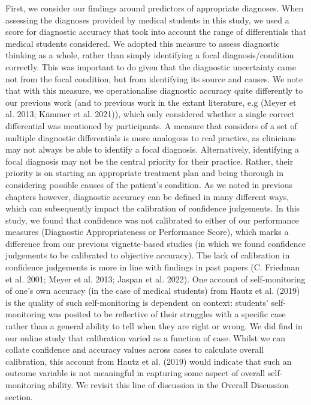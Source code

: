 \documentclass[a4paper, nobind]{templates/ociamthesis}
\begin{document}
First, we consider our findings around predictors of appropriate diagnoses. When assessing the diagnoses provided by medical students in this study, we used a score for diagnostic accuracy that took into account the range of differentials that medical students considered. We adopted this measure to assess diagnostic thinking as a whole, rather than simply identifying a focal diagnosis/condition correctly. This was important to do given that the diagnostic uncertainty came not from the focal condition, but from identifying its source and causes. We note that with this measure, we operationalise diagnostic accuracy quite differently to our previous work (and to previous work in the extant literature, e.g (Meyer et al. 2013; Kämmer et al. 2021)), which only considered whether a single correct differential was mentioned by participants. A measure that considers of a set of multiple diagnostic differentials is more analogous to real practice, as clinicians may not always be able to identify a focal diagnosis. Alternatively, identifying a focal diagnosis may not be the central priority for their practice. Rather, their priority is on starting an appropriate treatment plan and being thorough in considering possible causes of the patient's condition. As we noted in previous chapters however, diagnostic accuracy can be defined in many different ways, which can subsequently impact the calibration of confidence judgements. In this study, we found that confidence was not calibrated to either of our performance measures (Diagnostic Appropriateness or Performance Score), which marks a difference from our previous vignette-based studies (in which we found confidence judgements to be calibrated to objective accuracy). The lack of calibration in confidence judgements is more in line with findings in past papers (C. Friedman et al. 2001; Meyer et al. 2013; Jaspan et al. 2022). One account of self-monitoring of one's own accuracy (in the case of medical students) from Hautz et al. (2019) is the quality of such self-monitoring is dependent on context: students' self-monitoring was posited to be reflective of their struggles with a specific case rather than a general ability to tell when they are right or wrong. We did find in our online study that calibration varied as a function of case. Whilst we can collate confidence and accuracy values across cases to calculate overall calibration, this account from Hautz et al. (2019) would indicate that such an outcome variable is not meaningful in capturing some aspect of overall self-monitoring ability. We revisit this line of discussion in the Overall Discussion section.
\end{document}
